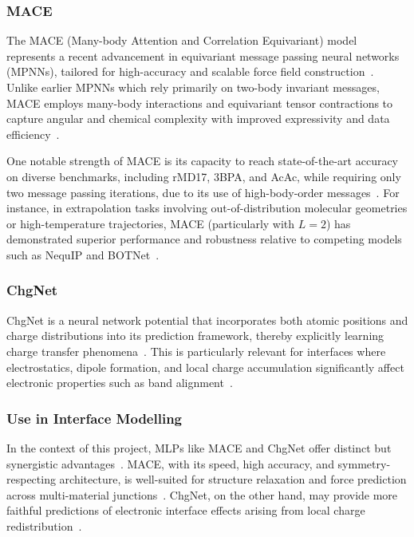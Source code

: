 \subsubsection*{MACE}

The MACE (Many-body Attention and Correlation Equivariant) model represents a recent advancement in equivariant message passing neural networks (MPNNs), tailored for high-accuracy and scalable force field construction~\nocite{}.
Unlike earlier MPNNs which rely primarily on two-body invariant messages, MACE employs many-body interactions and equivariant tensor contractions to capture angular and chemical complexity with improved expressivity and data efficiency~\cite{Batatia2022-xz}.

One notable strength of MACE is its capacity to reach state-of-the-art accuracy on diverse benchmarks, including rMD17, 3BPA, and AcAc, while requiring only two message passing iterations, due to its use of high-body-order messages~\nocite{}.
For instance, in extrapolation tasks involving out-of-distribution molecular geometries or high-temperature trajectories, MACE (particularly with $L=2$) has demonstrated superior performance and robustness relative to competing models such as NequIP and BOTNet~\cite{Batatia2022-xz, Batzner2022-fd}.

\subsubsection*{ChgNet}

ChgNet is a neural network potential that incorporates both atomic positions and charge distributions into its prediction framework, thereby explicitly learning charge transfer phenomena~\nocite{}.
This is particularly relevant for interfaces where electrostatics, dipole formation, and local charge accumulation significantly affect electronic properties such as band alignment~\cite{Deng2023-tg, Pitfield2025-ah}.

\subsubsection*{Use in Interface Modelling}

In the context of this project, MLPs like MACE and ChgNet offer distinct but synergistic advantages~\nocite{}.
MACE, with its speed, high accuracy, and symmetry-respecting architecture, is well-suited for structure relaxation and force prediction across multi-material junctions~\cite{Batatia2022-xz}.
ChgNet, on the other hand, may provide more faithful predictions of electronic interface effects arising from local charge redistribution~\cite{Deng2023-tg}.

